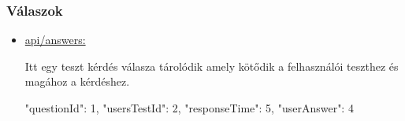 \subsubsection{Válaszok}
\begin{itemize}[label={$\bullet$}, topsep=0pt, itemsep=0pt, leftmargin=15pt]
    \item[] {\url{api/answers:}}
          \begin{addmargin}[\parindent]{0pt}
              Itt egy teszt kérdés válasza tárolódik amely kötődik a felhasználói teszthez és magához a kérdéshez.

              \begin{json}
                  {
                      "questionId": 1,
                      "usersTestId": 2,
                      "responseTime": 5,
                      "userAnswer": 4
                  }
              \end{json}
          \end{addmargin}
\end{itemize}


